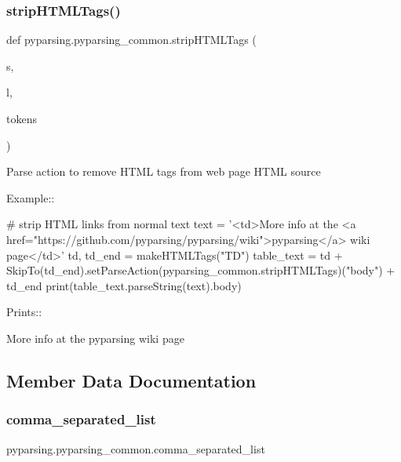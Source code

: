 \subsubsection{\texorpdfstring{strip\+H\+T\+M\+L\+Tags()}{stripHTMLTags()}}
{\footnotesize\ttfamily def pyparsing.\+pyparsing\+\_\+common.\+strip\+H\+T\+M\+L\+Tags (\begin{DoxyParamCaption}\item[{}]{s,  }\item[{}]{l,  }\item[{}]{tokens }\end{DoxyParamCaption})\hspace{0.3cm}{\ttfamily [static]}}

\begin{DoxyVerb}Parse action to remove HTML tags from web page HTML source

Example::

    # strip HTML links from normal text
    text = '<td>More info at the <a href="https://github.com/pyparsing/pyparsing/wiki">pyparsing</a> wiki page</td>'
    td, td_end = makeHTMLTags("TD")
    table_text = td + SkipTo(td_end).setParseAction(pyparsing_common.stripHTMLTags)("body") + td_end
    print(table_text.parseString(text).body)

Prints::

    More info at the pyparsing wiki page
\end{DoxyVerb}
 

\subsection{Member Data Documentation}
\mbox{\label{classpyparsing_1_1pyparsing__common_ab58fba89a97cbe3b44b50a5410b2a22b}} 
\subsubsection{\texorpdfstring{comma\+\_\+separated\+\_\+list}{comma\_separated\_list}}
{\footnotesize\ttfamily pyparsing.\+pyparsing\+\_\+common.\+comma\+\_\+separated\+\_\+list\hspace{0.3cm}{\ttfamily [static]}}

